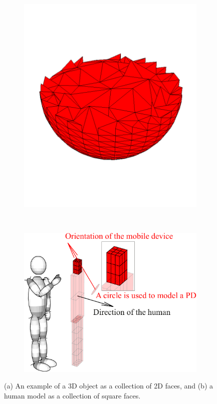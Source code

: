         \begin{figure}[h]
        \centering
        \begin{subfigure}[b]{0.49\columnwidth}
            \centering
            \includegraphics[width=0.5\columnwidth,draft=false]{./Appendix/figs/arb3d.pdf}
            \caption{}
        \end{subfigure}~
        \begin{subfigure}[b]{0.49\columnwidth}
            \centering
            \includegraphics[width=0.85\columnwidth,draft=false]{./ch_background/figs/humanmodel_rev2.pdf}
            \caption{}
        \end{subfigure}
        \caption{(a) An example of a 3D object as a collection of 2D faces, and (b) a human model as a collection of square faces.}
        \label{fig:ch_background:owcsimpy}
      \end{figure}

    

